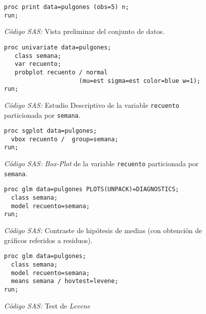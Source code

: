 \documentclass[11pt]{article}
\begin{document}
    \begin{figure}[!h]
      \centering
      \begin{verbatim}
proc print data=pulgones (obs=5) n;
run;
      \end{verbatim}
      \caption{\emph{Código SAS:} Vista preliminar del conjunto de datos.}
      \label{code:sas_2}
    \end{figure}

    \begin{figure}[!h]
      \centering
      \begin{verbatim}
proc univariate data=pulgones;
   class semana;
   var recuento;
   probplot recuento / normal
                     (mu=est sigma=est color=blue w=1);
run;
      \end{verbatim}
      \caption{\emph{Código SAS:} Estudio Descriptivo de la variable \texttt{recuento} particionada por \texttt{semana}.}
      \label{code:sas_3}
    \end{figure}

    \begin{figure}[!h]
      \centering
      \begin{verbatim}
proc sgplot data=pulgones;
  vbox recuento /  group=semana;
run;
      \end{verbatim}
      \caption{\emph{Código SAS:} \emph{Box-Plot} de la variable \texttt{recuento} particionada por \texttt{semana}.}
      \label{code:sas_4}
    \end{figure}

    \begin{figure}[!h]
      \centering
      \begin{verbatim}
proc glm data=pulgones PLOTS(UNPACK)=DIAGNOSTICS;
  class semana;
  model recuento=semana;
run;
      \end{verbatim}
      \caption{\emph{Código SAS:} Contraste de hipótesis de medias (con obtención de gráficos referidos a residuos).}
      \label{code:sas_5}
    \end{figure}

    \begin{figure}[!h]
      \centering
      \begin{verbatim}
proc glm data=pulgones;
  class semana;
  model recuento=semana;
  means semana / hovtest=levene;
run;
      \end{verbatim}
      \caption{\emph{Código SAS:} Test de \emph{Levene}}
      \label{code:sas_6}
    \end{figure}
\end{document}
